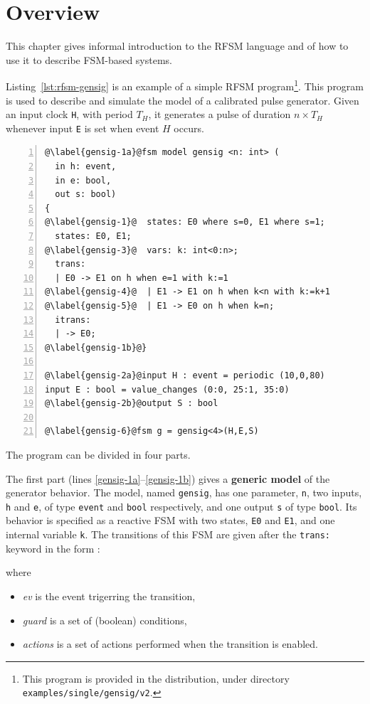 \chapter{Overview}
\label{cha:overview}

This chapter gives informal introduction to the RFSM language and of how to use it to describe 
FSM-based systems.

\medskip
Listing~\ref{lst:rfsm-gensig} is an example of a simple RFSM program\footnote{This program is
  provided in the distribution, under directory \texttt{examples/single/gensig/v2}.}. This program is
used to describe and simulate the model of a calibrated pulse generator. Given an input clock
\verb|H|, with period $T_H$, it generates a pulse of duration $n \times T_H$ whenever input
\texttt{E} is set when event $H$ occurs.

\begin{lstlisting}[language=Rfsm,frame=single,numbers=left,caption=A simple RFSM
  program,label={lst:rfsm-gensig},float]
@\label{gensig-1a}@fsm model gensig <n: int> (
  in h: event,
  in e: bool,
  out s: bool)
{
@\label{gensig-1}@  states: E0 where s=0, E1 where s=1;
  states: E0, E1;
@\label{gensig-3}@  vars: k: int<0:n>;
  trans:
  | E0 -> E1 on h when e=1 with k:=1
@\label{gensig-4}@  | E1 -> E1 on h when k<n with k:=k+1
@\label{gensig-5}@  | E1 -> E0 on h when k=n;
  itrans:
  | -> E0;
@\label{gensig-1b}@}

@\label{gensig-2a}@input H : event = periodic (10,0,80)
input E : bool = value_changes (0:0, 25:1, 35:0)
@\label{gensig-2b}@output S : bool 

@\label{gensig-6}@fsm g = gensig<4>(H,E,S)
\end{lstlisting}

The program can be divided in four parts.

\medskip The first part (lines \ref{gensig-1a}--\ref{gensig-1b}) gives a \textbf{generic model} of
the generator behavior. The model, named \verb|gensig|, has one parameter, \verb|n|, two inputs,
\verb|h| and \verb|e|, of type \verb|event| and \verb|bool| respectively, and one output \verb|s| of
type \verb|bool|. Its behavior is specified as a reactive FSM with two states, \verb|E0| and
\verb|E1|, and one internal variable \verb|k|. The transitions of this FSM are given after the
\verb|trans:| keyword in the form :
\begin{center}
\end{center}
where
\begin{itemize}
\item \emph{ev} is the event trigerring the transition,
\item \emph{guard} is a set of (boolean) conditions,
\item \emph{actions} is a set of actions performed when the transition is enabled.
\end{itemize}

